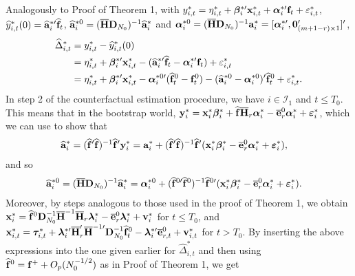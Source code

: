 \documentclass[12pt,fleqn]{article}
\begin{document}
Analogously to Proof of Theorem 1, with $y_{i,t}^* = \eta_{i,t}^* + \boldsymbol{\beta}_i^{*\prime}\mathbf{x}_{i,t}^* + \boldsymbol{\alpha}_i^{*\prime}\mathbf{f}_t + \varepsilon_{i,t}^*$, $\widehat y_{i,t}^*(0) = \widehat{\mathbf{a}}_i^{*\prime}\widehat{\mathbf{f}}_t$, $\widehat{\mathbf{a}}_i^{*0} = (\overline{\mathbf{H}}\mathbf{D}_{N_0})^{-1}\widehat{\mathbf{a}}_i^*$ and $\boldsymbol{\alpha}_i^{*0} = (\overline{\mathbf{H}}\mathbf{D}_{N_0})^{-1}\mathbf{a}_i^* = [\boldsymbol{\alpha}_i^{*\prime} ,\mathbf{0}_{(m+1-r)\times 1}' ]'$,
\begin{align}
\widehat \Delta_{i,t}^{*} & = y_{i,t}^{*} - \widehat y_{i,t}^{*}(0) \notag\\
& = \eta_{i,t}^{*} + \boldsymbol{\beta}_i^{*\prime}\mathbf{x}_{i,t}^{*} - (\widehat{\mathbf{a}}_i^{*\prime}\widehat{\mathbf{f}}_t - \boldsymbol{\alpha}_i^{*\prime}\mathbf{f}_t)  + \varepsilon_{i,t}^{*} \notag\\
& = \eta_{i,t}^* + \boldsymbol{\beta}_i^{*\prime}\mathbf{x}_{i,t}^*  - \boldsymbol{\alpha}_i^{*0\prime}(\widehat{\mathbf{f}}_t^{0}-\mathbf{f}_t^0) - (\widehat{\mathbf{a}}_i^{*0} - \boldsymbol{\alpha}_i^{*0})'\widehat{\mathbf{f}}_t^{0} + \varepsilon_{i,t}^*.
\end{align}
In step 2 of the counterfactual estimation procedure, we have $i \in \mathcal{I}_{1}$ and $t \leq T_0$. This means that in the bootstrap world, $\mathbf{y}_{i}^*= \mathbf{x}_{i}^*\boldsymbol{\beta}_i^* + \widehat{\mathbf{f}} \overline{\mathbf{H}}_{r}\boldsymbol{\alpha}_i^* - \overline{\mathbf{e}}_{r}^0\boldsymbol{\alpha}_i^* +  \boldsymbol{\varepsilon}_{i}^*$, which we can use to show that
\begin{align}
\widehat{\mathbf{a}}_i^* &= (\widehat{\mathbf{f}}'\widehat{\mathbf{f}})^{-1}\widehat{\mathbf{f}}'\mathbf{y}_{i}^*  =  \mathbf{a}_i^* + (\widehat{\mathbf{f}}'\widehat{\mathbf{f}})^{-1}\widehat{\mathbf{f}}'( \mathbf{x}_{i}^*\boldsymbol{\beta}_i^* - \overline{\mathbf{e}}_{r}^0\boldsymbol{\alpha}_i^* +  \boldsymbol{\varepsilon}_{i}^* ),
\end{align}
and so
\begin{align}
\widehat{\mathbf{a}}_i^{*0} & = (\overline{\mathbf{H}}\mathbf{D}_{N_0})^{-1}\widehat{\mathbf{a}}_i^* = \boldsymbol{\alpha}_i^{*0} + (\widehat{\mathbf{f}}^{0\prime}\widehat{\mathbf{f}}^0)^{-1}\widehat{\mathbf{f}}^{0\prime}(\mathbf{x}_{i}^*\boldsymbol{\beta}_i^*  - \overline{\mathbf{e}}_{r}^0\boldsymbol{\alpha}_i^* +  \boldsymbol{\varepsilon}_{i}^* ) .
\end{align}
Moreover, by steps analogous to those used in the proof of Theorem 1, we obtain $\mathbf{x}_i^* =  \widehat{\mathbf{f}}^0\mathbf{D}_{N_0}^{-1}\overline{\mathbf{H}}^{-1}\overline{\mathbf{H}}_{r}\boldsymbol{\lambda}_i^*  - \overline{\mathbf{e}}_{r}^0\boldsymbol{\lambda}_i^*  + \mathbf{v}_i^*$ for $t\leq T_0$, and $\mathbf{x}_{i,t}^* =  \boldsymbol{\tau}_{i,t}^* + \boldsymbol{\lambda}_i^{*\prime} \overline{\mathbf{H}}_{r}'\overline{\mathbf{H}}^{-1\prime}\mathbf{D}_{N_0}^{-1}\widehat{\mathbf{f}}_t^0  - \boldsymbol{\lambda}_i^{*\prime}\overline{\mathbf{e}}_{r,t}^0  + \mathbf{v}_{i,t}^*$ for $t > T_0$. By inserting the above expressions into the one given earlier for $\widehat \Delta_{i,t}^*$ and then using $\widehat{\mathbf{f}}^0 = \mathbf{f}^+ +  O_p(N_0^{-1/2})$ as in Proof of Theorem 1, we get
\end{document}
